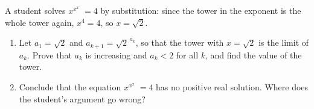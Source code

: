 A student solves $x^{x^{x^{\cdot^{\cdot^{\cdot}}}}}=4$ by substitution: since the tower in the exponent is the whole tower again, $x^4=4$, so $x=\sqrt2$.
\begin{enumerate}
\item[(a)] Let $a_1=\sqrt2$ and $a_{k+1}=\sqrt2^{\,a_k}$, so that the tower with $x=\sqrt2$ is the limit of $a_k$. Prove that $a_k$ is increasing and $a_k<2$ for all $k$, and find the value of the tower.
\item[(b)] Conclude that the equation $x^{x^{x^{\cdot^{\cdot^{\cdot}}}}}=4$ has no positive real solution. Where does the student's argument go wrong?
\end{enumerate}
